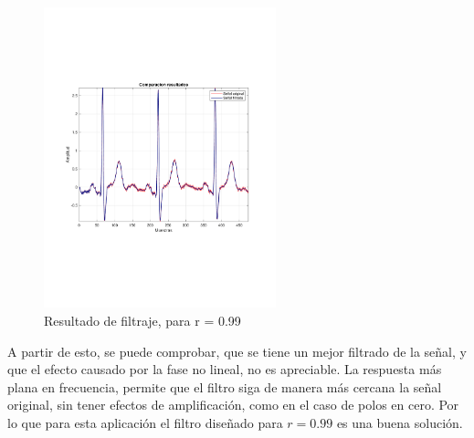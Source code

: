 		\begin{figure}[H]
			\center
			\includegraphics[width=0.6\textwidth,clip, trim = {1.9cm 6.8cm 2.3cm 7cm}]{../plots/egc_f_2_comparative.pdf}
			\caption{Resultado de filtraje, para r = 0.99}
			\label{fig:ecg_filter_r_099_result}
		\end{figure}
		
		A partir de esto, se puede comprobar, que se tiene un mejor filtrado de la señal, y que el efecto causado por la fase no lineal, no es apreciable. La respuesta más plana en frecuencia, permite que el filtro siga de manera más cercana la señal original, sin tener efectos de amplificación, como en el caso de polos en cero. Por lo que para esta aplicación el filtro diseñado para $r = 0.99$ es una buena solución. 
		
		
	
	